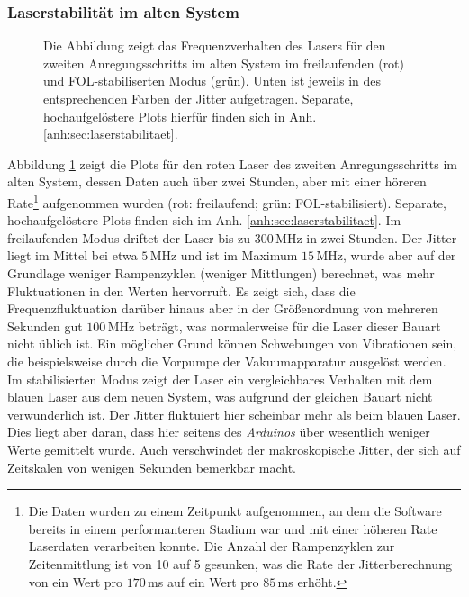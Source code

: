 \subsubsection{Laserstabilität im alten
System}\label{subsubsec:stabilitaetsmessungen_software_altes_system}
\begin{figure}[h]
 	\centering
 	\footnotesize
	
	\caption[Laserfrequenzverhalten altes System]{Die Abbildung zeigt das
	Frequenzverhalten des Lasers für den zweiten Anregungsschritts im alten System
	im freilaufenden (rot) und FOL-stabiliserten Modus (grün).
	Unten ist jeweils in des entsprechenden Farben der Jitter aufgetragen.
	Separate, hochaufgelöstere Plots hierfür finden sich in Anh.
	\ref{anh:sec:laserstabilitaet}.}
	\label{fig:laserstabilitaet_alt_alles}
\end{figure}
Abbildung \ref{fig:laserstabilitaet_alt_alles} zeigt die Plots für den
roten Laser des zweiten Anregungsschritts im alten System, dessen Daten auch
über zwei Stunden, aber mit einer höreren Rate\footnote{Die Daten wurden zu
einem Zeitpunkt aufgenommen, an dem die Software bereits in einem performanteren
Stadium war und mit einer höheren Rate Laserdaten verarbeiten konnte. Die Anzahl
der Rampenzyklen zur Zeitenmittlung ist von 10 auf 5 gesunken, was die Rate
der Jitterberechnung von ein Wert pro $170\,$ms auf ein Wert pro $85\,$ms
erhöht.} aufgenommen wurden (rot:
freilaufend; grün:
FOL-stabilisiert).
Separate, hochaufgelöstere Plots finden sich im Anh.
\ref{anh:sec:laserstabilitaet}. Im freilaufenden Modus driftet der Laser bis
zu $300\,$MHz in zwei Stunden. Der Jitter liegt im Mittel bei etwa $5\,$MHz und
ist im Maximum $15\,$MHz, wurde aber auf der Grundlage weniger Rampenzyklen
(weniger Mittlungen) berechnet, was mehr Fluktuationen in den Werten hervorruft.
Es zeigt sich, dass die Frequenzfluktuation darüber hinaus aber in der Größenordnung von mehreren Sekunden gut $100\,$MHz beträgt, was normalerweise für die Laser dieser Bauart
nicht üblich ist. Ein möglicher Grund können Schwebungen von Vibrationen sein,
die beispielsweise durch die Vorpumpe der Vakuumapparatur ausgelöst werden. Im
stabilisierten Modus zeigt der Laser ein vergleichbares Verhalten mit
dem blauen Laser aus dem neuen System, was aufgrund der gleichen Bauart nicht
verwunderlich ist. Der Jitter fluktuiert hier scheinbar mehr als beim blauen
Laser. Dies liegt aber daran, dass hier seitens des \textit{Arduinos} über
wesentlich weniger Werte gemittelt wurde. Auch verschwindet der makroskopische
Jitter, der sich auf Zeitskalen von wenigen Sekunden bemerkbar macht.\par
